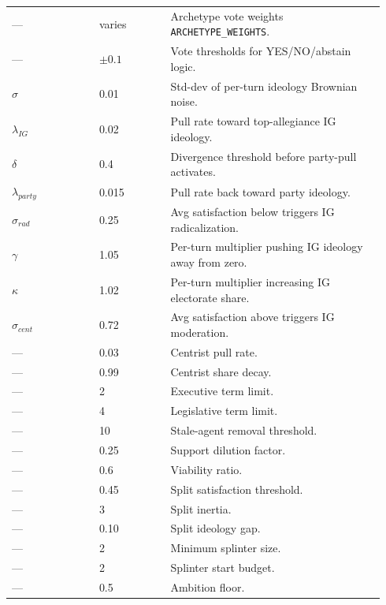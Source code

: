 \documentclass[11pt]{article}
\begin{document}
\begin{longtable}{@{}p{0.22\linewidth}p{0.18\linewidth}p{0.54\linewidth}@{}}
--- & varies & Archetype vote weights \texttt{ARCHETYPE\_WEIGHTS}. \\
--- & $\pm 0.1$ & Vote thresholds for YES/NO/abstain logic. \\

$\sigma$ & 0.01 & Std-dev of per-turn ideology Brownian noise. \\
$\lambda_{IG}$ & 0.02 & Pull rate toward top-allegiance IG ideology. \\
$\delta$ & 0.4 & Divergence threshold before party-pull activates. \\
$\lambda_{party}$ & 0.015 & Pull rate back toward party ideology. \\
$\sigma_{rad}$ & 0.25 & Avg satisfaction below triggers IG radicalization. \\
$\gamma$ & 1.05 & Per-turn multiplier pushing IG ideology away from zero. \\
$\kappa$ & 1.02 & Per-turn multiplier increasing IG electorate share. \\
$\sigma_{cent}$ & 0.72 & Avg satisfaction above triggers IG moderation. \\
--- & 0.03 & Centrist pull rate. \\
--- & 0.99 & Centrist share decay. \\

--- & 2 & Executive term limit. \\
--- & 4 & Legislative term limit. \\
--- & 10 & Stale-agent removal threshold. \\
--- & 0.25 & Support dilution factor. \\
--- & 0.6 & Viability ratio. \\

--- & 0.45 & Split satisfaction threshold. \\
--- & 3 & Split inertia. \\
--- & 0.10 & Split ideology gap. \\
--- & 2 & Minimum splinter size. \\
--- & 2 & Splinter start budget. \\
--- & 0.5 & Ambition floor. \\

\bottomrule
\end{longtable}
\end{document}

